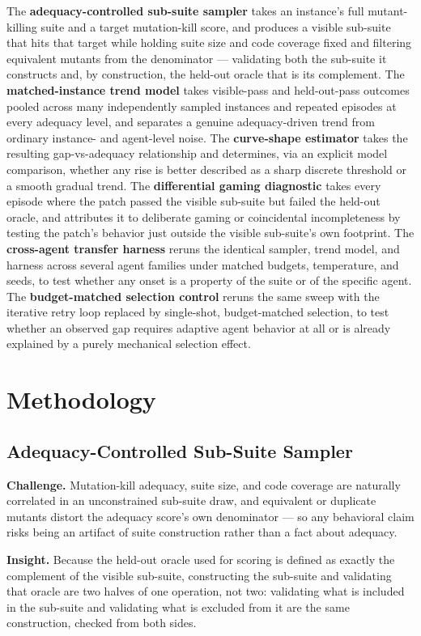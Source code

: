 \documentclass[11pt]{article}
\begin{document}
The \textbf{adequacy-controlled sub-suite sampler} takes an instance's full mutant-killing suite and a target mutation-kill score, and produces a visible sub-suite that hits that target while holding suite size and code coverage fixed and filtering equivalent mutants from the denominator --- validating both the sub-suite it constructs and, by construction, the held-out oracle that is its complement. The \textbf{matched-instance trend model} takes visible-pass and held-out-pass outcomes pooled across many independently sampled instances and repeated episodes at every adequacy level, and separates a genuine adequacy-driven trend from ordinary instance- and agent-level noise. The \textbf{curve-shape estimator} takes the resulting gap-vs-adequacy relationship and determines, via an explicit model comparison, whether any rise is better described as a sharp discrete threshold or a smooth gradual trend. The \textbf{differential gaming diagnostic} takes every episode where the patch passed the visible sub-suite but failed the held-out oracle, and attributes it to deliberate gaming or coincidental incompleteness by testing the patch's behavior just outside the visible sub-suite's own footprint. The \textbf{cross-agent transfer harness} reruns the identical sampler, trend model, and harness across several agent families under matched budgets, temperature, and seeds, to test whether any onset is a property of the suite or of the specific agent. The \textbf{budget-matched selection control} reruns the same sweep with the iterative retry loop replaced by single-shot, budget-matched selection, to test whether an observed gap requires adaptive agent behavior at all or is already explained by a purely mechanical selection effect.

\section{Methodology}

\subsection{Adequacy-Controlled Sub-Suite Sampler}
\textbf{Challenge.} Mutation-kill adequacy, suite size, and code coverage are naturally correlated in an unconstrained sub-suite draw, and equivalent or duplicate mutants distort the adequacy score's own denominator --- so any behavioral claim risks being an artifact of suite construction rather than a fact about adequacy.

\textbf{Insight.} Because the held-out oracle used for scoring is defined as exactly the complement of the visible sub-suite, constructing the sub-suite and validating that oracle are two halves of one operation, not two: validating what is included in the sub-suite and validating what is excluded from it are the same construction, checked from both sides.
\end{document}
